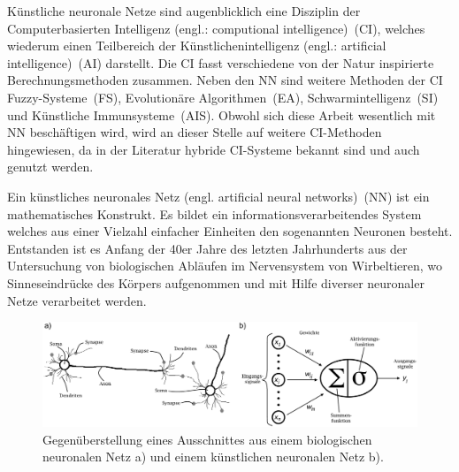 



Künstliche neuronale Netze sind augenblicklich eine Disziplin der Computerbasierten Intelligenz (engl.: computional intelligence)~(CI), welches wiederum einen Teilbereich der Künstlichenintelligenz (engl.: artificial intelligence)~(AI) darstellt. Die CI fasst verschiedene von der Natur inspirierte Berechnungsmethoden zusammen. Neben den NN sind weitere Methoden der CI Fuzzy-Systeme~(FS), Evolutionäre Algorithmen~(EA), Schwarmintelligenz~(SI) und Künstliche Immunsysteme~(AIS). Obwohl sich diese Arbeit wesentlich mit NN beschäftigen wird, wird an dieser Stelle auf weitere CI-Methoden hingewiesen, da in der Literatur hybride CI-Systeme bekannt sind und auch genutzt werden.

Ein künstliches neuronales Netz (engl. artificial neural networks)~(NN) ist ein mathematisches Konstrukt. Es bildet ein informationsverarbeitendes System welches aus einer Vielzahl einfacher Einheiten den sogenannten Neuronen besteht. Entstanden ist es Anfang der 40er Jahre des letzten Jahrhunderts aus der Untersuchung von biologischen Abläufen im Nervensystem von Wirbeltieren, wo Sinneseindrücke des Körpers aufgenommen und mit Hilfe diverser neuronaler Netze verarbeitet werden.

\begin{figure}[!htb]
    \centering
        \includegraphics[width=1\textwidth]{Bilder/misc/BNN_ANN.png}
    \caption{Gegenüberstellung eines Ausschnittes aus einem biologischen neuronalen Netz a)\protect\footnotemark{} und einem künstlichen neuronalen Netz b).}
    \label{fig:BNN_ANN}
\end{figure}

